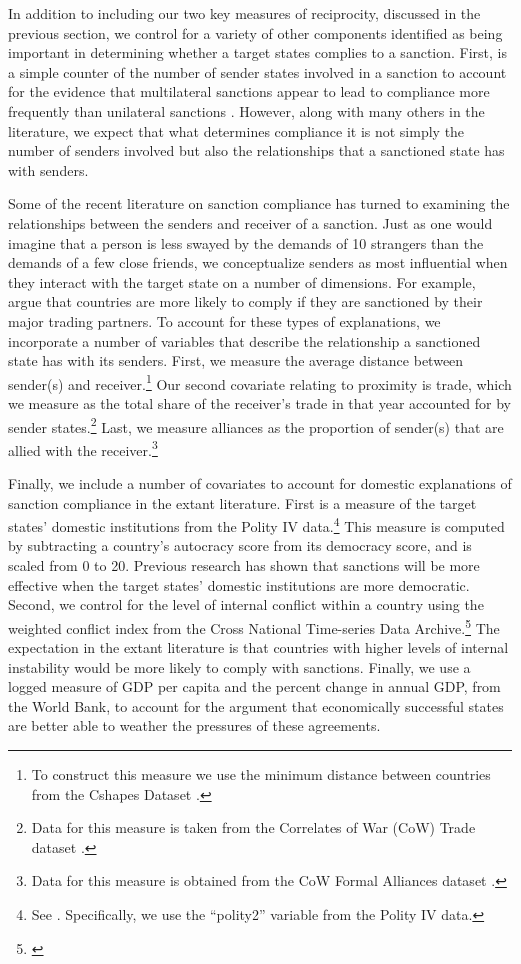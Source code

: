 In addition to including our two key measures of reciprocity, discussed in the previous section, we control for a variety of other components identified as being important in determining whether a target states complies to a sanction. First, is a simple counter of the number of sender states involved in a sanction to account for the evidence that multilateral sanctions appear to lead to compliance more frequently than unilateral sanctions \citep{bapat2009multilateral}. However, along with many others in the literature, we expect that what determines compliance it is not simply the number of senders involved but also the relationships that a sanctioned state has with senders.

Some of the recent literature on sanction compliance has turned to examining the relationships between the senders and receiver of a sanction. Just as one would imagine that a person is less swayed by the demands of 10 strangers than the demands of a few close friends, we conceptualize senders as most influential when they interact with the target state on a number of dimensions. For example, \cite{mclean2010friends} argue that countries are more likely to comply if they are sanctioned by their major trading partners. To account for these types of explanations, we incorporate a number of variables that describe the relationship a sanctioned state has with its senders. First, we measure the average distance between sender(s) and receiver.\footnote{To construct this measure we use the minimum distance between countries from the Cshapes Dataset \citep{weidmann2010geography}.} Our second covariate relating to proximity is trade, which we measure as the total share of the receiver's trade in that year accounted for by sender states.\footnote{Data for this measure is taken from the Correlates of War (CoW) Trade dataset \citep{barbieri2009trading}.} Last, we measure alliances as the proportion of sender(s) that are allied with the receiver.\footnote{Data for this measure is obtained from the CoW Formal Alliances dataset \citep{gibler2004measuring}.}

Finally, we include a number of covariates to account for domestic explanations of sanction compliance in the extant literature. First is a measure of the target states' domestic institutions from the Polity IV data.\footnote{See \cite{marshall2002polity}. Specifically, we use the ``polity2'' variable from the Polity IV data.} This measure is computed by subtracting a country's autocracy score from its democracy score, and is scaled from 0 to 20. Previous research has shown that sanctions will be more effective when the target states' domestic institutions are more democratic. Second, we control for the level of internal conflict within  a country using the weighted conflict index from the Cross National Time-series Data Archive.\footnote{\cite{banks2011cross}} The expectation in the extant literature is that countries with higher levels of internal instability would be more likely to comply with sanctions. Finally, we use a logged measure of GDP per capita and the percent change in annual GDP, from the World Bank, to account for the argument that economically successful states are better able to weather the pressures of these agreements.

